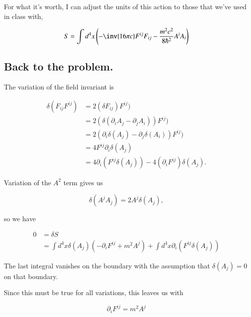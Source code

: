 For what it's worth, I can adjust the units of this action to those that we've used in class with,

\begin{equation}\label{eqn:relativisticElectrodynamicsL14:800}
S = \int d^4 x \left( -\inv{16 \pi c} F^{ij} F_{ij} - \frac{m^2 c^2}{8 \hbar^2} A^i A_i \right)
\end{equation}

\subsection{Back to the problem.}

%
The variation of the field invariant is

\begin{align*}
\delta (F_{ij} F^{ij})
&=
2 (\delta F_{ij}) F^{ij}) \\
&=
2 (\delta(\partial_i A_j -\partial_j A_i)) F^{ij}) \\
&=
2 (\partial_i \delta(A_j) -\partial_j \delta(A_i)) F^{ij}) \\
&=
4 F^{ij} \partial_i \delta(A_j) \\
&=
4 \partial_i (F^{ij} \delta(A_j)) - 4 (\partial_i F^{ij}) \delta(A_j).
\end{align*}

Variation of the $A^2$ term gives us

\begin{equation}\label{eqn:relativisticElectrodynamicsL14:700}
\delta (A^j A_j) = 2 A^j \delta(A_j),
\end{equation}

so we have

\begin{align*}
0 &= \delta S \\
&= \int d^4 x \delta(A_j) \left( -\partial_i F^{ij} + m^2 A^j \right)
+ \int d^4 x \partial_i (F^{ij} \delta(A_j))
\end{align*}

The last integral vanishes on the boundary with the assumption that $\delta(A_j) = 0$ on that boundary.

Since this must be true for all variations, this leaves us with

\begin{equation}\label{eqn:relativisticElectrodynamicsL14:720}
\partial_i F^{ij} = m^2 A^j
\end{equation}

